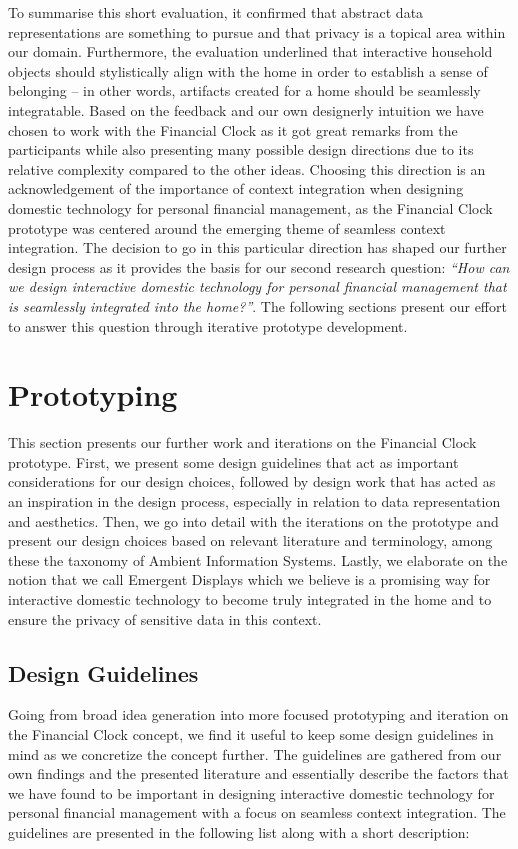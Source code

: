To summarise this short evaluation, it confirmed that abstract data representations are something to pursue and that privacy is a topical area within our domain. Furthermore, the evaluation underlined that interactive household objects should stylistically align with the home in order to establish a sense of belonging -- in other words, artifacts created for a home should be seamlessly integratable. Based on the feedback and our own designerly intuition we have chosen to work with the Financial Clock as it got great remarks from the participants while also presenting many possible design directions due to its relative complexity compared to the other ideas. Choosing this direction is an acknowledgement of the importance of context integration when designing domestic technology for personal financial management, as the Financial Clock prototype was centered around the emerging theme of seamless context integration. The decision to go in this particular direction has shaped our further design process as it provides the basis for our second research question: \emph{“How can we design interactive domestic technology for personal financial management that is seamlessly integrated into the home?”}. The following sections present our effort to answer this question through iterative prototype development.

\section{Prototyping}
This section presents our further work and iterations on the Financial Clock prototype. First, we present some design guidelines that act as important considerations for our design choices, followed by design work that has acted as an inspiration in the design process, especially in relation to data representation and aesthetics. Then, we go into detail with the iterations on the prototype and present our design choices based on relevant literature and terminology, among these the taxonomy of Ambient Information Systems. Lastly, we elaborate on the notion that we call Emergent Displays which we believe is a promising way for interactive domestic technology to become truly integrated in the home and to ensure the privacy of sensitive data in this context.

\subsection{Design Guidelines}
Going from broad idea generation into more focused prototyping and iteration on the Financial Clock concept, we find it useful to keep some design guidelines in mind as we concretize the concept further. The guidelines are gathered from our own findings and the presented literature and essentially describe the factors that we have found to be important in designing interactive domestic technology for personal financial management with a focus on seamless context integration. The guidelines are presented in the following list along with a short description:


